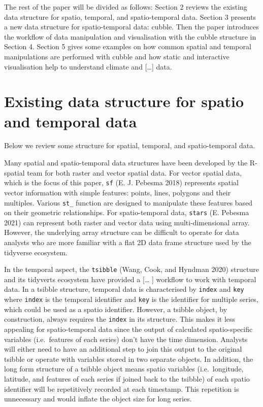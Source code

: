\documentclass{article}
\begin{document}
The rest of the paper will be divided as follows: Section 2 reviews the
existing data structure for spatio, temporal, and spatio-temporal data.
Section 3 presents a new data structure for spatio-temporal data:
cubble. Then the paper introduces the workflow of data manipulation and
visualisation with the cubble structure in Section 4. Section 5 gives
some examples on how common spatial and temporal manipulations are
performed with cubble and how static and interactive visualisation help
to understand climate and {[}\ldots{]} data.

\hypertarget{existing-data-structure-for-spatio-and-temporal-data}{%
\section{Existing data structure for spatio and temporal
data}\label{existing-data-structure-for-spatio-and-temporal-data}}

Below we review some structure for spatial, temporal, and
spatio-temporal data.

Many spatial and spatio-temporal data structures have been developed by
the R-spatial team for both raster and vector spatial data. For vector
spatial data, which is the focus of this paper, \texttt{sf} (E. J.
Pebesma 2018) represents spatial vector information with simple
features: points, lines, polygons and their multiples. Various
\texttt{st\_} function are designed to manipulate these features based
on their geometric relationships. For spatio-temporal data,
\texttt{stars} (E. Pebesma 2021) can represent both raster and vector
data using multi-dimensional array. However, the underlying array
structure can be difficult to operate for data analysts who are more
familiar with a flat 2D data frame structure used by the tidyverse
ecosystem.

In the temporal aspect, the \texttt{tsibble} (Wang, Cook, and Hyndman
2020) structure and its tidyverts ecosystem have provided a {[}\ldots{}
{]} workflow to work with temporal data. In a tsibble structure,
temporal data is characterised by \texttt{index} and \texttt{key} where
\texttt{index} is the temporal identifier and \texttt{key} is the
identifier for multiple series, which could be used as a spatio
identifier. However, a tsibble object, by construction, always requires
the \texttt{index} in its structure. This makes it less appealing for
spatio-temporal data since the output of calculated spatio-specific
variables (i.e.~features of each series) don't have the time dimension.
Analysts will either need to have an additional step to join this output
to the original tsibble or operate with variables stored in two separate
objects. In addition, the long form structure of a tsibble object means
spatio variables (i.e.~longitude, latitude, and features of each series
if joined back to the tsibble) of each spatio identifier will be
repetitively recorded at each timestamp. This repetition is unnecessary
and would inflate the object size for long series.
\end{document}
